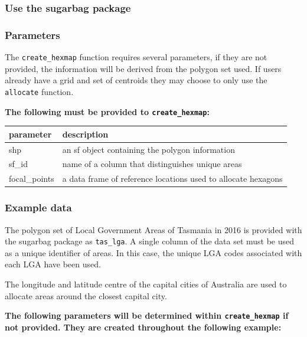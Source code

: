 \hypertarget{use-the-sugarbag-package}{%
\subsubsection{Use the sugarbag
package}\label{use-the-sugarbag-package}}

\hypertarget{parameters}{%
\subsubsection{Parameters}\label{parameters}}

The \texttt{create\_hexmap} function requires several parameters, if
they are not provided, the information will be derived from the polygon
set used. If users already have a grid and set of centroids they may
choose to only use the \texttt{allocate} function.

\textbf{The following must be provided to \texttt{create\_hexmap}:}

\begin{Schunk}

\begin{tabular}{l|l}
\hline
parameter & description\\
\hline
shp & an sf object containing the polygon information\\
\hline
sf\_id & name of a column that distinguishes unique areas\\
\hline
focal\_points & a data frame of reference locations used to allocate hexagons\\
\hline
\end{tabular}

\end{Schunk}

\hypertarget{example-data}{%
\subsubsection{Example data}\label{example-data}}

The polygon set of Local Government Areas of Tasmania in 2016 is
provided with the sugarbag package as \texttt{tas\_lga}. A single column
of the data set must be used as a unique identifier of areas. In this
case, the unique LGA codes associated with each LGA have been used.

The longitude and latitude centre of the capital cities of Australia are
used to allocate areas around the closest capital city.

\textbf{The following parameters will be determined within
\texttt{create\_hexmap} if not provided. They are created throughout the
following example:}

